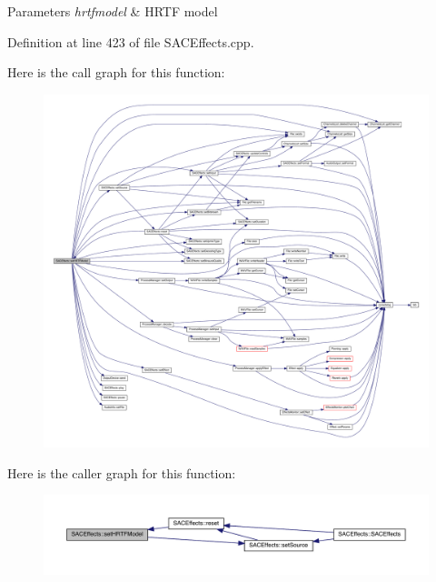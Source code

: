 \begin{DoxyParams}{Parameters}
{\em hrtfmodel} & H\+R\+TF model \\
\hline
\end{DoxyParams}


Definition at line 423 of file S\+A\+C\+Effects.\+cpp.

Here is the call graph for this function\+:
\nopagebreak
\begin{figure}[H]
\begin{center}
\leavevmode
\includegraphics[width=350pt]{class_s_a_c_effects_a9af83c6a63fcdf10e4bd849fa3c5973c_cgraph}
\end{center}
\end{figure}
Here is the caller graph for this function\+:
\nopagebreak
\begin{figure}[H]
\begin{center}
\leavevmode
\includegraphics[width=350pt]{class_s_a_c_effects_a9af83c6a63fcdf10e4bd849fa3c5973c_icgraph}
\end{center}
\end{figure}
\mbox{\label{class_s_a_c_effects_a5292df44aee2a4ec49c99e3136b5472e}} 
